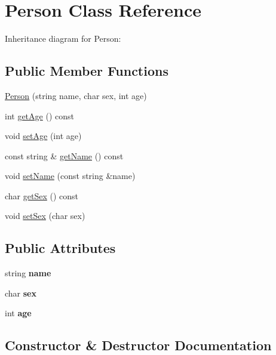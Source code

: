 \hypertarget{classPerson}{}\section{Person Class Reference}
\label{classPerson}


Inheritance diagram for Person\+:
\subsection*{Public Member Functions}
\begin{DoxyCompactItemize}
\item 
\hyperlink{classPerson_a621351fb3dc5edf7cd49431df461ed3c}{Person} (string name, char sex, int age)
\item 
int \hyperlink{classPerson_a4b66dbee570398920b8fb6aacddd2559}{get\+Age} () const
\item 
void \hyperlink{classPerson_ac8ade54c27a0657c987c395ff04a9d46}{set\+Age} (int age)
\item 
const string \& \hyperlink{classPerson_aa9526f35351ff117b980e8e011219263}{get\+Name} () const
\item 
void \hyperlink{classPerson_a4b39c1f5d600b1e41ef95c09f4b42935}{set\+Name} (const string \&name)
\item 
char \hyperlink{classPerson_a0cb92dfb78e6f780829188e6b38a42bf}{get\+Sex} () const
\item 
void \hyperlink{classPerson_aa8c70c136001ef24d5cb7ae4819485b5}{set\+Sex} (char sex)
\end{DoxyCompactItemize}
\subsection*{Public Attributes}
\begin{DoxyCompactItemize}
\item 
\mbox{\label{classPerson_a669b64897b4d823a27bb5866368d4dfa}} 
string {\bfseries name}
\item 
\mbox{\label{classPerson_a46160b0d796577b5be3fe686969e3bb6}} 
char {\bfseries sex}
\item 
\mbox{\label{classPerson_acf9db1a60683f40b20ae569d29852d69}} 
int {\bfseries age}
\end{DoxyCompactItemize}


\subsection{Constructor \& Destructor Documentation}
\mbox{\label{classPerson_a621351fb3dc5edf7cd49431df461ed3c}} 
